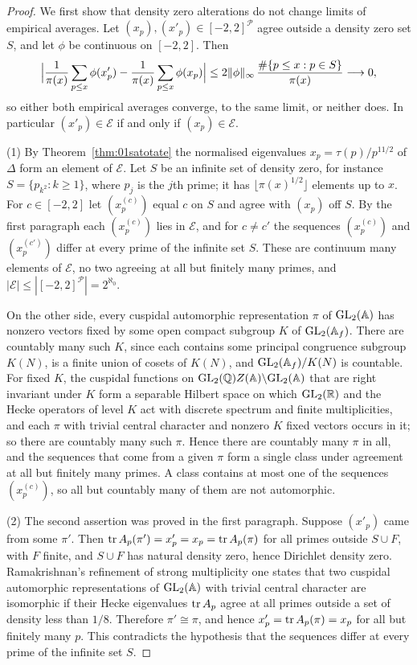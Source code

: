 \begin{proof}
We first show that density zero alterations do not change limits of empirical averages. Let $(x_p),(x'_p)\in[-2,2]^{\mathcal P}$ agree outside a density zero set $S$, and let $\phi$ be continuous on $[-2,2]$. Then
\[
\Bigl|\frac1{\pi(x)}\sum_{p\le x}\phi(x'_p)-\frac1{\pi(x)}\sum_{p\le x}\phi(x_p)\Bigr|\le 2\|\phi\|_\infty\,\frac{\#\{p\le x:p\in S\}}{\pi(x)}\longrightarrow0,
\]
so either both empirical averages converge, to the same limit, or neither does. In particular $(x'_p)\in\mathcal E$ if and only if $(x_p)\in\mathcal E$.

(1) By Theorem~\ref{thm:01satotate} the normalised eigenvalues $x_p=\tau(p)/p^{11/2}$ of $\Delta$ form an element of $\mathcal E$. Let $S$ be an infinite set of density zero, for instance $S=\{p_{k^2}:k\ge1\}$, where $p_j$ is the $j$th prime; it has $\lfloor\pi(x)^{1/2}\rfloor$ elements up to $x$. For $c\in[-2,2]$ let $(x^{(c)}_p)$ equal $c$ on $S$ and agree with $(x_p)$ off $S$. By the first paragraph each $(x^{(c)}_p)$ lies in $\mathcal E$, and for $c\ne c'$ the sequences $(x^{(c)}_p)$ and $(x^{(c')}_p)$ differ at every prime of the infinite set $S$. These are continuum many elements of $\mathcal E$, no two agreeing at all but finitely many primes, and $|\mathcal E|\le|[-2,2]^{\mathcal P}|=2^{\aleph_0}$.

On the other side, every cuspidal automorphic representation $\pi$ of $\mathrm{GL}_2(\mathbb{A})$ has nonzero vectors fixed by some open compact subgroup $K$ of $\mathrm{GL}_2(\mathbb{A}_f)$. There are countably many such $K$, since each contains some principal congruence subgroup $K(N)$, is a finite union of cosets of $K(N)$, and $\mathrm{GL}_2(\mathbb{A}_f)/K(N)$ is countable. For fixed $K$, the cuspidal functions on $\mathrm{GL}_2(\mathbb{Q})Z(\mathbb{A})\backslash\mathrm{GL}_2(\mathbb{A})$ that are right invariant under $K$ form a separable Hilbert space on which $\mathrm{GL}_2(\mathbb{R})$ and the Hecke operators of level $K$ act with discrete spectrum and finite multiplicities, and each $\pi$ with trivial central character and nonzero $K$ fixed vectors occurs in it; so there are countably many such $\pi$. Hence there are countably many $\pi$ in all, and the sequences that come from a given $\pi$ form a single class under agreement at all but finitely many primes. A class contains at most one of the sequences $(x^{(c)}_p)$, so all but countably many of them are not automorphic.

(2) The second assertion was proved in the first paragraph. Suppose $(x'_p)$ came from some $\pi'$. Then $\operatorname{tr} A_p(\pi')=x'_p=x_p=\operatorname{tr} A_p(\pi)$ for all primes outside $S\cup F$, with $F$ finite, and $S\cup F$ has natural density zero, hence Dirichlet density zero. Ramakrishnan's refinement of strong multiplicity one \cite{ramakrishnan1994} states that two cuspidal automorphic representations of $\mathrm{GL}_2(\mathbb{A})$ with trivial central character are isomorphic if their Hecke eigenvalues $\operatorname{tr} A_p$ agree at all primes outside a set of density less than $1/8$. Therefore $\pi'\cong\pi$, and hence $x'_p=\operatorname{tr} A_p(\pi)=x_p$ for all but finitely many $p$. This contradicts the hypothesis that the sequences differ at every prime of the infinite set $S$.
\end{proof}

